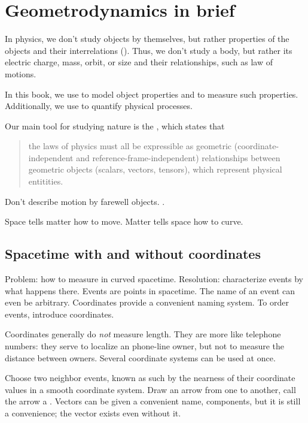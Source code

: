 
\section{Geometrodynamics in brief}

In physics, we don't study objects by themselves, but rather  properties of the objects and their interrelations (). Thus, we don't study a body, but rather its electric charge, mass, orbit, or size and their relationships, such as law of motions. 

In this book, we use  to model object properties and to measure such properties. Additionally, we use  to quantify physical processes.

Our main tool for studying nature is the , which states that
%
\begin{quotation}
the laws of physics must all be expressible as geometric (coordinate-independent and reference-frame-independent) relationships between geometric objects (scalars, vectors, tensors), which represent physical entitities.
\end{quotation}

Don't describe motion by farewell objects. .

Space tells matter how to move. Matter tells space how to curve.


\subsection{Spacetime with and without coordinates}

Problem: how to measure in curved spacetime. Resolution: characterize events by what happens there. Events are points in spacetime. The name of an event can even be arbitrary. Coordinates provide a convenient naming system. To order events, introduce coordinates.

Coordinates generally do \emph{not} measure length. They are more like telephone numbers: they serve to localize an phone-line owner, but not to measure the distance between owners. Several coordinate systems can be used at once.

Choose two neighbor events, known as such by the nearness of their coordinate values in a smooth coordinate system. Draw an arrow from one to another, call the arrow a . Vectors can be given a convenient name, components, but it is still a convenience; the vector exists even without it.

